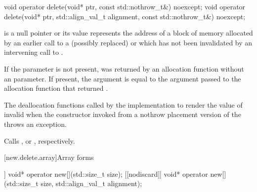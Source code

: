 %
\begin{itemdecl}
void operator delete(void* ptr, const std::nothrow_t&) noexcept;
void operator delete(void* ptr, std::align_val_t alignment, const std::nothrow_t&) noexcept;
\end{itemdecl}

\begin{itemdescr}
\pnum
\expects
{} is a null pointer or
its value represents the address of
a block of memory allocated by
an earlier call to a (possibly replaced)
or
which has not been invalidated by an intervening call to
.

\pnum
If the  parameter is not present,
 was returned by an allocation function
without an  parameter.
If present, the  argument
is equal to the  argument
passed to the allocation function that returned .

\pnum
\effects
The
deallocation functions
called by the implementation
to render the value of  invalid
when the constructor invoked from a nothrow
placement version of the  throws an exception.

\pnum
\replaceable
{}

\pnum
{}
Calls ,
or ,
respectively.
\end{itemdescr}

[new.delete.array]{Array forms}

%
\begin{itemdecl}
[[nodiscard]] void* operator new[](std::size_t size);
[[nodiscard]] void* operator new[](std::size_t size, std::align_val_t alignment);
\end{itemdecl}

